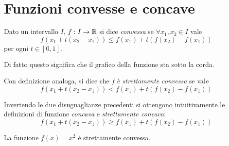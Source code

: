 \section{Funzioni convesse e concave}

\begin{definition}
Dato un intervallo $I$, $f: I \to \mathbb R$ si dice \emph{convessa} se $\forall x_1, x_2 \in I$ vale
\begin{equation*}
f(x_1 + t(x_2-x_1)) \le f(x_1) + t(f(x_2)-f(x_1))
\end{equation*}
per ogni $t \in [0,1]$.
\end{definition}

\begin{center}
\end{center}

Di fatto questo significa che il grafico della funzione sta sotto la corda.

Con definizione analoga, si dice che $f$ è \emph{strettamente convessa} se vale
\begin{equation*}
f(x_1 + t(x_2-x_1)) < f(x_1) + t(f(x_2)-f(x_1))
\end{equation*}

Invertendo le due disuguaglianze precedenti si ottengono intuitivamente le definizioni di funzione \emph{concava} e \emph{strettamente concava}:
\begin{equation*}
f(x_1 + t(x_2-x_1)) \ge f(x_1) + t(f(x_2)-f(x_1))
\end{equation*}

\begin{center}
\end{center}

\begin{example}
La funzione $f(x) = x^2$ è strettamente convessa.
\begin{center}
\end{center}
\end{example}

